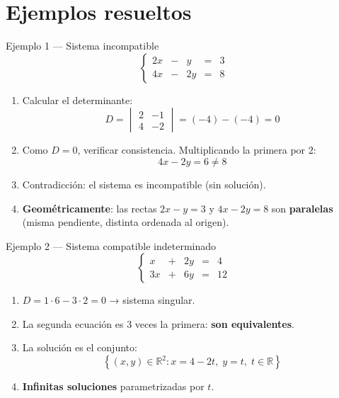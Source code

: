 \documentclass[11pt, aspectratio=169]{beamer}
\newcommand{\R}{\mathbb{R}}
\newcommand{\deter}[4]{\begin{vmatrix} #1 & #2 \\ #3 & #4 \end{vmatrix}}
\begin{document}
	\section{Ejemplos resueltos}
	
	\begin{frame}{Ejemplo 1 — Sistema incompatible}
		\[
		\left\{
		\begin{array}{rcrcr}
			2x & - & y  & = & 3 \\[4pt]
			4x & - & 2y & = & 8
		\end{array}
		\right.
		\]
		
		\begin{enumerate}
			\item Calcular el determinante:
			\[ D = \deter{2}{-1}{4}{-2} = (-4)-(-4) = 0 \]
			\item<2-> Como $D = 0$, verificar consistencia. Multiplicando la primera por 2:
			\[ 4x - 2y = 6 \neq 8 \]
			\item<3-> Contradicción: \alert{el sistema es incompatible} (sin solución).
			
			\item<4-> \textbf{Geométricamente}: las rectas $2x-y=3$ y $4x-2y=8$
			son \textbf{paralelas} (misma pendiente, distinta ordenada al origen).
		\end{enumerate}
	\end{frame}
	
	\begin{frame}{Ejemplo 2 — Sistema compatible indeterminado}
		\[
		\left\{
		\begin{array}{rcrcr}
			x  & + & 2y & = & 4 \\[4pt]
			3x & + & 6y & = & 12
		\end{array}
		\right.
		\]
		
		\begin{enumerate}
			\item<1-> $D = 1\cdot6 - 3\cdot2 = 0$ \;→\; sistema singular.
			\item<2-> La segunda ecuación es $3$ veces la primera: \textbf{son equivalentes}.
			\item<3-> La solución es el conjunto:
			\[
			\left\{(x,y) \in \R^2 : x = 4 - 2t,\; y = t,\; t \in \R \right\}
			\]
			\item<4-> \textbf{Infinitas soluciones} parametrizadas por $t$.
		\end{enumerate}
		
		\vspace{0.4em}
	\end{frame}
	
\end{document}
